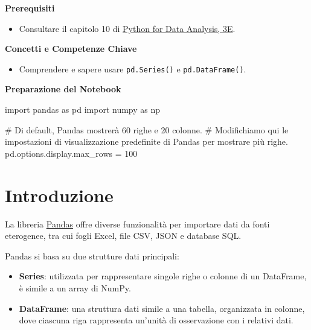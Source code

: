 \documentclass[
  letterpaper,
  krantz2]{{[}./krantz{]}}
\newenvironment{Shaded}{\begin{snugshade}}{\end{snugshade}}
\newcommand{\CommentTok}[1]{\textcolor[rgb]{0.37,0.37,0.37}{#1}}
\newcommand{\DecValTok}[1]{\textcolor[rgb]{0.68,0.00,0.00}{#1}}
\newcommand{\ImportTok}[1]{\textcolor[rgb]{0.00,0.46,0.62}{#1}}
\newcommand{\NormalTok}[1]{\textcolor[rgb]{0.00,0.23,0.31}{#1}}
\newcommand{\OperatorTok}[1]{\textcolor[rgb]{0.37,0.37,0.37}{#1}}
\providecommand{\tightlist}{%
  \setlength{\itemsep}{0pt}\setlength{\parskip}{0pt}}\usepackage{longtable,booktabs,array}
\begin{document}
\textbf{Prerequisiti}

\begin{itemize}
\tightlist
\item
  Consultare il capitolo 10 di
  \href{https://wesmckinney.com/book/data-aggregation.html}{Python for
  Data Analysis, 3E}.
\end{itemize}

\textbf{Concetti e Competenze Chiave}

\begin{itemize}
\tightlist
\item
  Comprendere e sapere usare \texttt{pd.Series()} e
  \texttt{pd.DataFrame()}.
\end{itemize}

\textbf{Preparazione del Notebook}

\begin{Shaded}
\begin{Highlighting}[]
\ImportTok{import}\NormalTok{ pandas }\ImportTok{as}\NormalTok{ pd}
\ImportTok{import}\NormalTok{ numpy }\ImportTok{as}\NormalTok{ np}

\CommentTok{\# Di default, Pandas mostrerà 60 righe e 20 colonne. }
\CommentTok{\# Modifichiamo qui le impostazioni di visualizzazione predefinite di Pandas per mostrare più righe.}
\NormalTok{pd.options.display.max\_rows }\OperatorTok{=} \DecValTok{100}
\end{Highlighting}
\end{Shaded}

\section*{Introduzione}\label{introduzione-1}


La libreria \href{https://Pandas.pydata.org/docs/index.html}{Pandas}
offre diverse funzionalità per importare dati da fonti eterogenee, tra
cui fogli Excel, file CSV, JSON e database SQL.

Pandas si basa su due strutture dati principali:

\begin{itemize}
\tightlist
\item
  \textbf{Series}: utilizzata per rappresentare singole righe o colonne
  di un DataFrame, è simile a un array di NumPy.
\item
  \textbf{DataFrame}: una struttura dati simile a una tabella,
  organizzata in colonne, dove ciascuna riga rappresenta un'unità di
  osservazione con i relativi dati.
\end{itemize}
\end{document}
